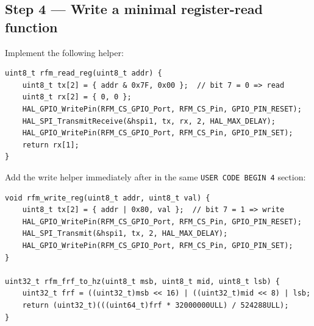 \documentclass[11pt,letterpaper]{article}
\begin{document}
\newpage
\subsection{Step 4 --- Write a minimal register-read function}
Implement the following helper:
\begin{verbatim}
uint8_t rfm_read_reg(uint8_t addr) {
    uint8_t tx[2] = { addr & 0x7F, 0x00 };  // bit 7 = 0 => read
    uint8_t rx[2] = { 0, 0 };
    HAL_GPIO_WritePin(RFM_CS_GPIO_Port, RFM_CS_Pin, GPIO_PIN_RESET);
    HAL_SPI_TransmitReceive(&hspi1, tx, rx, 2, HAL_MAX_DELAY);
    HAL_GPIO_WritePin(RFM_CS_GPIO_Port, RFM_CS_Pin, GPIO_PIN_SET);
    return rx[1];
}
\end{verbatim}
Add the write helper immediately after in the same \texttt{USER CODE BEGIN 4} section:
\begin{verbatim}
void rfm_write_reg(uint8_t addr, uint8_t val) {
    uint8_t tx[2] = { addr | 0x80, val };  // bit 7 = 1 => write
    HAL_GPIO_WritePin(RFM_CS_GPIO_Port, RFM_CS_Pin, GPIO_PIN_RESET);
    HAL_SPI_Transmit(&hspi1, tx, 2, HAL_MAX_DELAY);
    HAL_GPIO_WritePin(RFM_CS_GPIO_Port, RFM_CS_Pin, GPIO_PIN_SET);
}

uint32_t rfm_frf_to_hz(uint8_t msb, uint8_t mid, uint8_t lsb) {
	uint32_t frf = ((uint32_t)msb << 16) | ((uint32_t)mid << 8) | lsb;
	return (uint32_t)(((uint64_t)frf * 32000000ULL) / 524288ULL);
}
\end{verbatim}

\newpage
\end{document}
